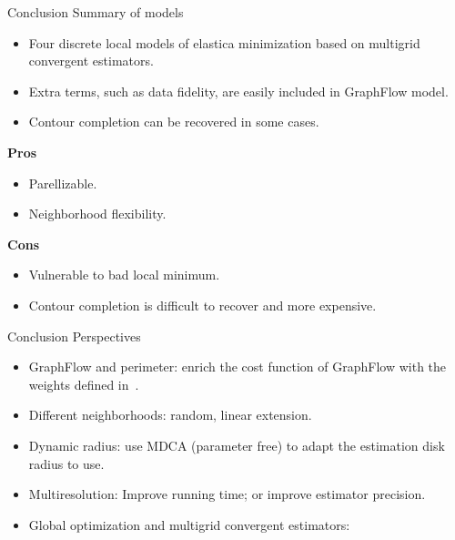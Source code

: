 \begin{frame}
{Conclusion}
{Summary of models}

\begin{itemize}
\item{Four discrete local models of elastica minimization based on multigrid convergent estimators.}
\item{Extra terms, such as data fidelity, are easily included in GraphFlow model.}
\item{Contour completion can be recovered in some cases.}
\end{itemize}

\textbf{Pros}
\begin{itemize}
\item{Parellizable.}
\item{Neighborhood flexibility.}
\end{itemize}

\textbf{Cons}
\begin{itemize}
\item{Vulnerable to bad local minimum.}
\item{Contour completion is difficult to recover and more expensive.}
\end{itemize}

\end{frame}

\begin{frame}
{Conclusion}
{Perspectives}

\begin{itemize}
\item{GraphFlow and perimeter: enrich the cost function of GraphFlow with the weights defined in~\cite{}. }
\item{Different neighborhoods: random, linear extension.}
\item{Dynamic radius: use MDCA (parameter free) to adapt the estimation disk radius to use.}
\item{Multiresolution: Improve running time; or improve estimator precision.}
\item{Global optimization and multigrid convergent estimators: }
\end{itemize}

\end{frame}
